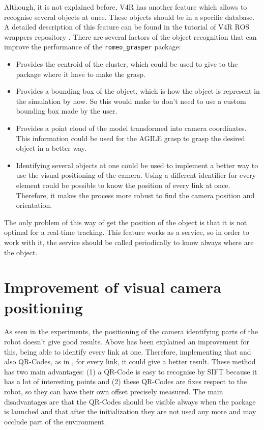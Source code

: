 \documentclass[12pt,a4paper,final,twoside,openright]{report}
\begin{document}
Although, it is not explained before, V4R has another feature which allows to recognise several objects at once. These objects should be in a specific database. A detailed description of this feature can be found in the tutorial of V4R ROS wrappers repository \cite{gitV4RWrappers}. There are several factors of the object recognition that can improve the performance of the \texttt{romeo\_grasper} package:

\begin{itemize}
\item Provides the centroid of the cluster, which could be used to give to the package where it have to make the grasp.
\item Provides a bounding box of the object, which is how the object is represent in the simulation by now. So this would make to don't need to use a custom bounding box made by the user.
\item Provides a point cloud of the model transformed into camera coordinates. This information could be used for the AGILE grasp to grasp the desired object in a better way.
\item Identifying several objects at one could be used to implement a better way to use the visual positioning of the camera. Using a different identifier for every element could be possible to know the position of every link at once. Therefore, it makes the process more robust to find the camera position and orientation. 
\end{itemize}

The only problem of this way of get the position of the object is that it is not optimal for a real-time tracking. This feature works as a service, so in order to work with it, the service should be called periodically to know always where are the object.

\section{Improvement of visual camera positioning}

As seen in the experiments, the positioning of the camera identifying parts of the robot doesn't give good results. Above has been explained an improvement for this, being able to identify every link at one. Therefore, implementing that and also QR-Codes, as in \cite{claudio:hal-01159882}, for every link, it could give a better result. These method has two main advantages: (1) a QR-Code is easy to recognise by SIFT because it has a lot of interesting points and (2) these QR-Codes are fixes respect to the robot, so they can have their own offset precisely measured. The main disadvantages are that the QR-Codes should be visible always when the package is launched and that after the initialization they are not used any more and may occlude part of the environment.
\end{document}
